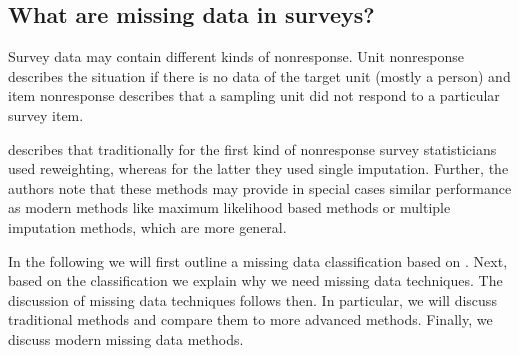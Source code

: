 \subsection{What are missing data in surveys?}

Survey data may contain different kinds of nonresponse. Unit nonresponse describes the situation if there is no data of the target unit (mostly a person) and item nonresponse describes that a sampling unit did not respond to a particular survey item. \par

\cite{schafer2002missing} describes that traditionally for the first kind of nonresponse survey statisticians used reweighting, whereas for the latter they used single imputation.
Further, the authors note that these methods may provide in special cases similar performance as modern methods like maximum likelihood based methods or multiple imputation methods, which are more general. \par

In the following we will first outline a missing data classification based on \cite{rubin1976}. 
Next, based on the classification we explain why we need missing data techniques. 
The discussion of missing data techniques follows then. In particular, we will discuss traditional methods and compare them to more advanced methods. 
Finally, we discuss modern missing data methods. \par

